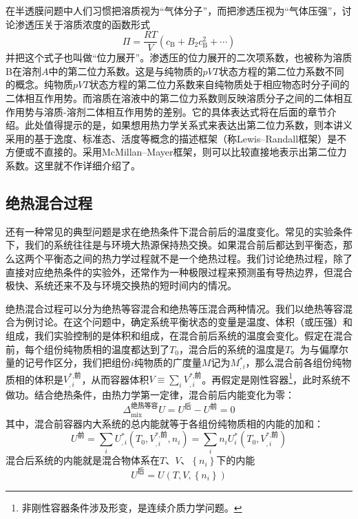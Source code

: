 \documentclass[main.tex]{subfiles}
\begin{document}
在半透膜问题中人们习惯把溶质视为“气体分子”，而把渗透压视为“气体压强”，讨论渗透压关于溶质浓度的函数形式
\[\Pi=\frac{RT}{V}\left(c_\text{B}+B_2c_\text{B}^2+\cdots\right)\]
并把这个式子也叫做“位力展开”。渗透压的位力展开的二次项系数，也被称为溶质B在溶剂$A$中的第二位力系数。这是与纯物质的$pVT$状态方程的第二位力系数不同的概念。纯物质$pVT$状态方程的第二位力系数来自纯物质处于相应物态时分子间的二体相互作用势。而溶质在溶液中的第二位力系数则反映溶质分子之间的二体相互作用势与溶质-溶剂二体相互作用势的差别。它的具体表达式将在后面的章节介绍。此处值得提示的是，如果想用热力学关系式来表达出第二位力系数，则本讲义采用的基于逸度、标准态、活度等概念的描述框架（称Lewis--Randall框架）是不方便或不直接的。采用McMillan--Mayer框架，则可以比较直接地表示出第二位力系数\cite{Mollerup2009}。这里就不作详细介绍了。

\subsection{绝热混合过程}
还有一种常见的典型问题是求在绝热条件下混合前后的温度变化。常见的实验条件下，我们的系统往往是与环境大热源保持热交换。如果混合前后都达到平衡态，那么这两个平衡态之间的热力学过程就不是一个绝热过程。我们讨论绝热过程，除了直接对应绝热条件的实验外，还常作为一种极限过程来预测虽有导热边界，但混合极快、系统还来不及与环境交换热的短时间内的情况。

绝热混合过程可以分为绝热等容混合和绝热等压混合两种情况。我们以绝热等容混合为例讨论。在这个问题中，确定系统平衡状态的变量是温度、体积（或压强）和组成，我们实验控制的是体积和组成，在混合前后系统的温度会变化。假定在混合前，每个组份纯物质相的温度都达到了$T_0$，混合后的系统的温度是$T$。为与偏摩尔量的记号作区分，我们把组份$i$纯物质的广度量$M$记为$M_{,i}^*$，那么混合前各组份纯物质相的体积是$V_{,i}^\text{*,前}$，从而容器体积$V\equiv\sum_iV_{,i}^\text{*,前}$。再假定是刚性容器\footnote{非刚性容器条件涉及形变，是连续介质力学问题。}，此时系统不做功。结合绝热条件，由热力学第一定律，混合前后内能变化为零：
\[\Delta_\text{mix}^\text{绝热等容}U=U^\text{后}-U^\text{前}=0\]
其中，混合前容器内大系统的总内能就等于各组份纯物质相的内能的加和：
\[U^\text{前}=\sum_i U_{,i}^*\left(T_0,V_{,i}^\text{*,前},n_i\right)=\sum_in_iU_i^*\left(T_0,V_{,i}^\text{*,前}\right)\]
混合后系统的内能就是混合物体系在$T$、$V$、$\left\{n_i\right\}$下的内能
\[U^\text{后}=U\left(T,V,\left\{n_i\right\}\right)\]
\end{document}
